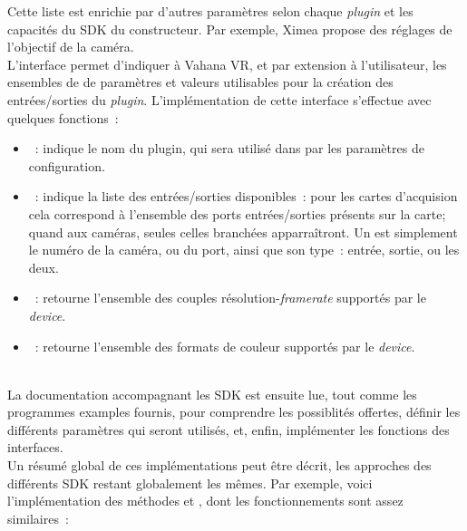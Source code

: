 Cette liste est enrichie par d'autres paramètres selon chaque \textit{plugin} et 
les capacités du SDK du constructeur. Par exemple, Ximea propose des réglages
de l'objectif de la caméra.\\
\newline
L'interface  permet d'indiquer à Vahana VR, et par extension
à l'utilisateur, les ensembles de de paramètres et valeurs utilisables pour la
création des entrées/sorties du \textit{plugin}. 
L'implémentation de cette interface s'effectue avec quelques fonctions~:
\begin{itemize}
  \item {}~: indique le nom du plugin, qui sera utilisé
  dans par les paramètres de configuration.
  \item {}~: indique la liste des entrées/sorties
  disponibles~: pour les cartes d'acquision cela correspond à l'ensemble des ports
  entrées/sorties présents sur la carte; quand aux caméras, seules celles branchées apparraîtront. 
  Un  est simplement le numéro de la caméra, ou du port, ainsi
  que son type~: entrée, sortie, ou les deux.
  \item {}~:
  retourne l'ensemble des couples résolution-\textit{framerate} supportés par le \textit{device}.
  \item {}~:
  retourne l'ensemble des formats de couleur supportés par le \textit{device}.\end{itemize}
\ \\
La documentation accompagnant les SDK est ensuite lue, tout comme les programmes
examples fournis, pour comprendre les possiblités offertes, définir les différents
paramètres qui seront utilisés, et, enfin, implémenter les fonctions des interfaces.\\
Un résumé global de ces implémentations peut être décrit, les approches des différents SDK restant globalement
les mêmes.
Par exemple, voici l'implémentation des méthodes  
et , dont les fonctionnements sont assez similaires~:
